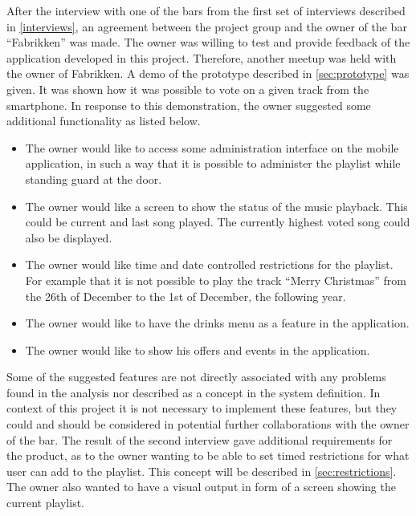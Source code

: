 \label{sec:fabrikken}
After the interview with one of the bars from the first set of interviews described in \cref{interviews}, an agreement between the project group and the owner of the bar \enquote{Fabrikken} was made. The owner was willing to test and provide feedback of the application developed in this project. Therefore, another meetup was held with the owner of Fabrikken. A demo of the prototype described in \cref{sec:prototype} was given. It was shown how it was possible to vote on a given track from the smartphone. In response to this demonstration, the owner suggested some additional functionality as listed below.

\begin{itemize}
    \item{The owner would like to access some administration interface on the mobile application, in such a way that it is possible to administer the playlist while standing guard at the door.}
    \item{The owner would like a screen to show the status of the music playback. This could be current and last song played. The currently highest voted song could also be displayed.}
    \item{The owner would like time and date controlled restrictions for the playlist. For example that it is not possible to play the track \enquote{Merry Christmas} from the 26th of December to the 1st of December, the following year.}
    \item{The owner would like to have the drinks menu as a feature in the application.}
    \item{The owner would like to show his offers and events in the application.}
\end{itemize}

Some of the suggested features are not directly associated with any
problems found in the analysis nor described as a concept in the
system definition. In context of this project it is not
necessary to implement these features, but they could and should be
considered in potential further collaborations with the owner of the
bar. The result of the second interview gave additional requirements
for the product, as to the owner wanting to be able to set timed
restrictions for what user can add to the playlist. This concept will
be described in \cref{sec:restrictions}. The owner also wanted to have
a visual output in form of a screen showing the current playlist.
